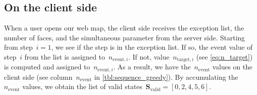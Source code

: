 \documentclass[twocolumn]{svjour3}          %
\begin{document}



\subsection{On the client side}
\label{sec:communicate_client}


When a user opens our web map,
the client side receives the exception list, the number of faces, 
and the simultaneous parameter from the server side.
Starting from step~$i=1$,
we see if the step is in the exception list.
If so, the event value of step~$i$ from the list 
is assigned to~$n_{\mathrm{event},i}$.
If not, value~$n_{\mathrm{target},i}$ (see \eq\ref{eq:n_target})
is computed and assigned to~$n_{\mathrm{event},i}$.
As a result, we have the~$n_\mathrm{event}$ values on the client side
(see column~$n_\mathrm{event}$ in \tabl\ref{tbl:sequence_greedy}).
By accumulating the~$n_\mathrm{event}$ values,
we obtain the list of 
valid states~$\mathrm{\textbf{S}_{valid}} = [0, 2, 4, 5, 6]$.
\end{document}
